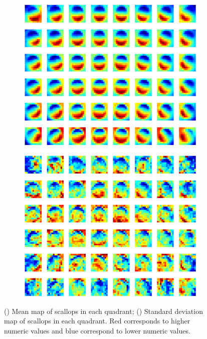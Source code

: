 \documentclass {udthesis}
\begin{document}
\begin{figure}
  \centering
  \begin{subfigure}[]{0.45\textwidth}
      \includegraphics[width=\textwidth]{mean_scallop_quadrants}
      \caption{}
      \label{subfig:mean_quadrant}
  \end{subfigure}
  \begin{subfigure}[]{0.45\textwidth}
      \includegraphics[width=\textwidth]{stddev_scallop_quadrants}        
      \caption{}
      \label{subfig:stddev_quadrant}
  \end{subfigure}
  \caption[Mean and variance map of scallops in each quadrant]{() Mean map of scallops in each quadrant; () Standard deviation map of scallops in each quadrant.
  Red corresponds to higher numeric values and blue correspond to lower numeric values.}
  \label{fig:mean_stddev_quadrant}
\end{figure}
\end{document}

